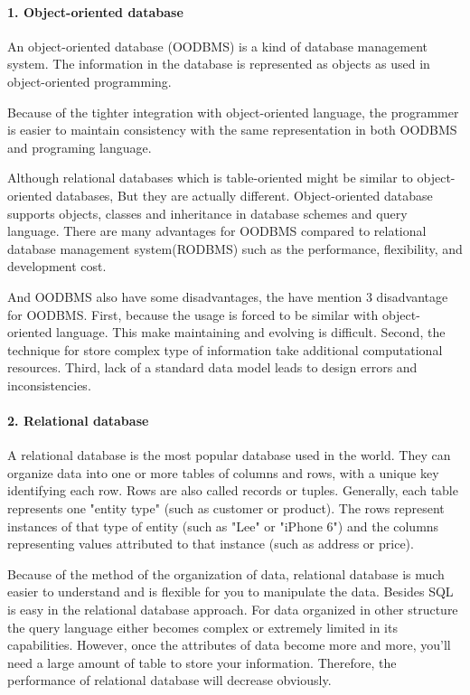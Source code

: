 \paragraph{1. Object-oriented database}
An object-oriented database (OODBMS) is a kind of database management 	system.\cite{WiKiauthor2013} The information in the database is represented as objects as used in object-oriented programming.

Because of the tighter integration with object-oriented language, the programmer is easier to maintain consistency with the same representation in both OODBMS and programing language.

Although relational databases which is table-oriented might be similar to object-oriented databases, But they are actually different. Object-oriented database supports objects, classes and inheritance in database schemes and query language.
There are many advantages for OODBMS compared to relational database management system(RODBMS) such as the performance, flexibility, and development cost.

And OODBMS also have some disadvantages, the \cite{Systems2010} have mention 3 disadvantage for OODBMS. First, because the usage is forced to be similar with object-oriented language. This make maintaining and evolving is  difficult. Second, the technique for store complex type of information take additional computational resources. Third, lack of a standard data model leads to design errors and inconsistencies.


\paragraph{2. Relational database}
A relational database is the most popular database used in the world. They can organize data into one or more tables of columns and rows, with a unique key identifying each row. Rows are also called records or tuples. Generally, each table represents one "entity type" (such as customer or product). The rows represent instances of that type of entity (such as "Lee" or "iPhone 6") and the columns representing values attributed to that instance (such as address or price).

Because of the method of the organization of data, relational database is much easier to understand and is flexible for you to manipulate the data. Besides SQL is easy in the relational database approach. For data organized in other structure the query language either becomes complex or extremely limited in its capabilities. However, once the attributes of data become more and more, you'll need a large amount of table to store your information. Therefore, the performance of relational database will decrease obviously.


